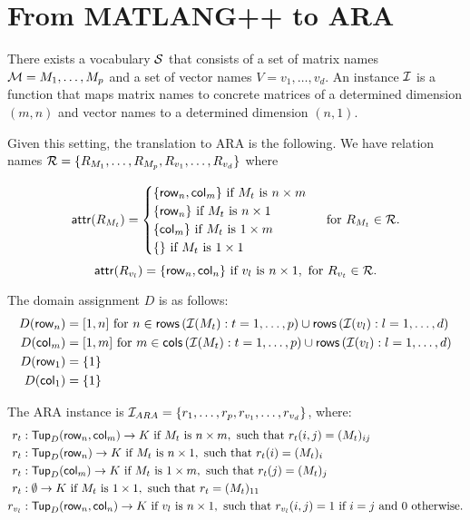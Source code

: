 \newcommand{\row}{\mathsf{row}}
\newcommand{\rows}{\mathsf{rows}}
\newcommand{\col}{\mathsf{col}}
\newcommand{\cols}{\mathsf{cols}}

\section{From MATLANG++ to ARA}

There exists a vocabulary $\mathcal{S}$ that consists of a set of matrix names $\mathcal{M}=M_1,\ldots, M_p$ and a set of vector names $V=v_1,\ldots, v_d$. An instance $\mathcal{I}$ is a function that maps matrix names to concrete matrices of a determined dimension $(m,n)$ and vector names to a determined dimension $(n, 1)$.

Given this setting, the translation to ARA is the following. We have relation names $ \mathcal{R}=\lbrace R_{M_1}, \ldots, R_{M_p}, R_{v_1}, \ldots, R_{v_d}\rbrace$ where 

\[
	\attr{R_{M_t}} = \begin{cases}
		\lbrace\row_n,\col_m \rbrace \text{ if } M_t \text{ is } n\times m \\
		\lbrace\row_n \rbrace \text{ if } M_t \text{ is } n\times 1 \\
		\lbrace\col_m \rbrace \text{ if } M_t \text{ is } 1\times m \\
		\lbrace\rbrace \text{ if } M_t \text{ is } 1\times 1 \\
	\end{cases} \text{ for } R_{M_t}\in\cR.
\]
$$\attr{R_{v_l}} = \lbrace\row_n,\col_n \rbrace \text{ if } v_l \text{ is } n\times 1, \text{ for } R_{v_t}\in\cR.$$

The domain assignment $D$ is as follows:
\begin{align*}
	D(\row_n)&=[1, n]\text{ for } n\in\rows\left( \cI(M_t): t=1,\ldots, p\right)\cup\rows\left( \cI(v_l): l=1,\ldots, d\right) \\
	D(\col_m)&=[1, m]\text{ for } m\in\cols\left( \cI(M_t): t=1,\ldots, p\right)\cup\rows\left( \cI(v_l): l=1,\ldots, d\right) \\
	D(\row_1) &=\lbrace 1\rbrace \\
	D(\col_1) &=\lbrace 1\rbrace
\end{align*}

The ARA instance is $\mathcal{I}_{ARA}=\lbrace r_1,\ldots,r_p,r_{v_1},\ldots, r_{v_d}\rbrace$, where:
\begin{align*}
r_t&: \Tup_D(\row_n,\col_m)\rightarrow K \text{ if }  M_t \text{ is } n\times m, \text{ such that } r_t(i,j)=(M_t)_{ij} \\
r_t&: \Tup_D(\row_n)\rightarrow K \text{ if }  M_t \text{ is } n\times 1, \text{ such that } r_t(i)=(M_t)_{i} \\
r_t&: \Tup_D(\col_m)\rightarrow K \text{ if }  M_t \text{ is } 1\times m, \text{ such that } r_t(j)=(M_t)_{j} \\
r_t&: \emptyset\rightarrow K \text{ if }  M_t \text{ is } 1\times 1, \text{ such that } r_t=(M_t)_{11} \\
r_{v_l}&: \Tup_D(\row_n,\col_n)\rightarrow K \text{ if }  v_l \text{ is } n\times 1, \text{ such that } r_{v_l}(i,j)=1 \text{ if } i=j \text{ and } 0 \text{ otherwise.}
\end{align*}

